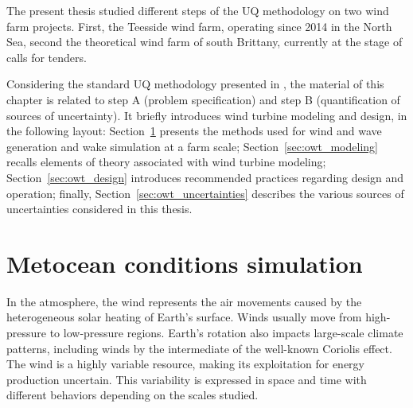 The present thesis studied different steps of the UQ methodology on two wind farm projects. 
First, the Teesside wind farm, operating since 2014 in the North Sea, second the theoretical wind farm of south Brittany, currently at the stage of calls for tenders.

Considering the standard UQ methodology presented in , the material of this chapter is related to step A (problem specification) and step B (quantification of sources of uncertainty). 
It briefly introduces wind turbine modeling and design, in the following layout: 
Section~\ref{sec:metocean_simulation} presents the methods used for wind and wave generation and wake simulation at a farm scale; 
Section~\ref{sec:owt_modeling} recalls elements of theory associated with wind turbine modeling; 
Section~\ref{sec:owt_design} introduces recommended practices regarding design and operation; 
finally, Section~\ref{sec:owt_uncertainties} describes the various sources of uncertainties considered in this thesis. 



\section{Metocean conditions simulation} \label{sec:metocean_simulation}

In the atmosphere, the wind represents the air movements caused by the heterogeneous solar heating of Earth's surface. 
Winds usually move from high-pressure to low-pressure regions. 
Earth's rotation also impacts large-scale climate patterns, including winds by the intermediate of the well-known Coriolis effect. 
The wind is a highly variable resource, making its exploitation for energy production uncertain. 
This variability is expressed in space and time with different behaviors depending on the scales studied. 


